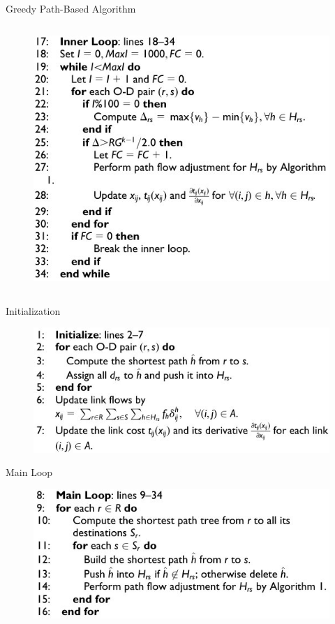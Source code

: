 \documentclass{beamer}
\begin{document}
\begin{frame}{Greedy Path-Based Algorithm}
\begin{columns}
    \begin{column}{0.33\textwidth}
    \begin{figure}
    \includegraphics[width=\textwidth]{./alg23.jpg}
    \end{figure}
    \end{column}
\end{columns}
\end{frame}


\begin{frame}{Initialization}
    \begin{figure}
    \includegraphics[width=\textwidth]{./alg21.jpg}
    \end{figure}
\end{frame}


\begin{frame}{Main Loop}
    \begin{figure}
    \includegraphics[width=\textwidth]{./alg22.jpg}
    \end{figure}
\end{frame}
\end{document}
